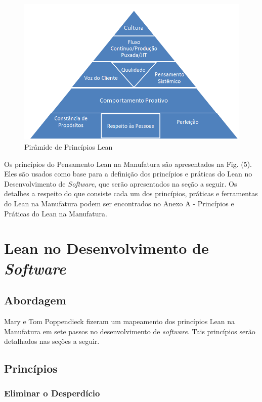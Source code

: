\begin{figure}[H]
		\centering
		\label{fig02}
			\includegraphics[scale=0.7]{figuras/principioslean.png}
		\caption{Pirâmide de Princípios Lean}
\end{figure}

Os princípios do Pensamento Lean na Manufatura são apresentados na Fig. (5). Eles são usados como base para a definição dos princípios e práticas do Lean no Desenvolvimento de \textit{Software}, que serão apresentados na seção a seguir. Os detalhes a respeito do que consiste cada um dos princípios, práticas e ferramentas do Lean na Manufatura podem ser encontrados no Anexo A - Princípios e Práticas do Lean na Manufatura.

\section[Lean no Desenvolvimento de \textit{Software}]{Lean no Desenvolvimento de \textit{ Software}}

\subsection[Abordagem]{Abordagem}

Mary e Tom Poppendieck fizeram um mapeamento dos princípios Lean na Manufatura em sete passos no desenvolvimento de \textit{software}. Tais princípios serão detalhados nas seções a seguir. 

\subsection[Princípios]{Princípios}

\subsubsection[Eliminar o Desperdício]{Eliminar o Desperdício}

